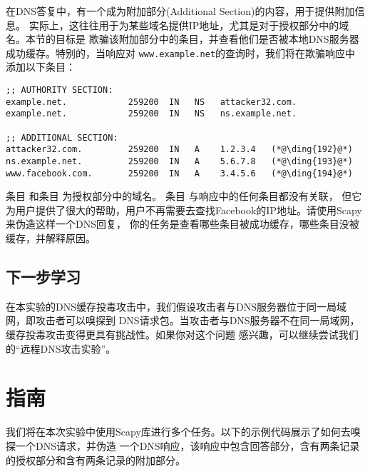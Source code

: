 在DNS答复中，有一个成为附加部分(Additional Section)的内容，用于提供附加信息。
实际上，这往往用于为某些域名提供IP地址，尤其是对于授权部分中的域名。本节的目标是
欺骗该附加部分中的条目，并查看他们是否被本地DNS服务器成功缓存。特别的，当响应对
\texttt{www.example.net}的查询时，我们将在欺骗响应中添加以下条目：


\begin{lstlisting}
;; AUTHORITY SECTION:
example.net.            259200  IN   NS   attacker32.com.
example.net.            259200  IN   NS   ns.example.net.

;; ADDITIONAL SECTION:
attacker32.com.         259200  IN   A    1.2.3.4   (*@\ding{192}@*)
ns.example.net.         259200  IN   A    5.6.7.8   (*@\ding{193}@*)
www.facebook.com.       259200  IN   A    3.4.5.6   (*@\ding{194}@*)
\end{lstlisting}

条目  和条目  为授权部分中的域名。 条目  与响应中的任何条目都没有关联，
但它为用户提供了很大的帮助，用户不再需要去查找Facebook的IP地址。请使用Scapy来伪造这样一个DNS回复，
你的任务是查看哪些条目被成功缓存，哪些条目没被缓存，并解释原因。
 

\subsection{下一步学习}


在本实验的DNS缓存投毒攻击中，我们假设攻击者与DNS服务器位于同一局域网，即攻击者可以嗅探到
DNS请求包。当攻击者与DNS服务器不在同一局域网，缓存投毒攻击变得更具有挑战性。如果你对这个问题
感兴趣，可以继续尝试我们的``远程DNS攻击实验''。




\section{指南}


我们将在本次实验中使用Scapy库进行多个任务。以下的示例代码展示了如何去嗅探一个DNS请求，并伪造
一个DNS响应，该响应中包含回答部分，含有两条记录的授权部分和含有两条记录的附加部分。



